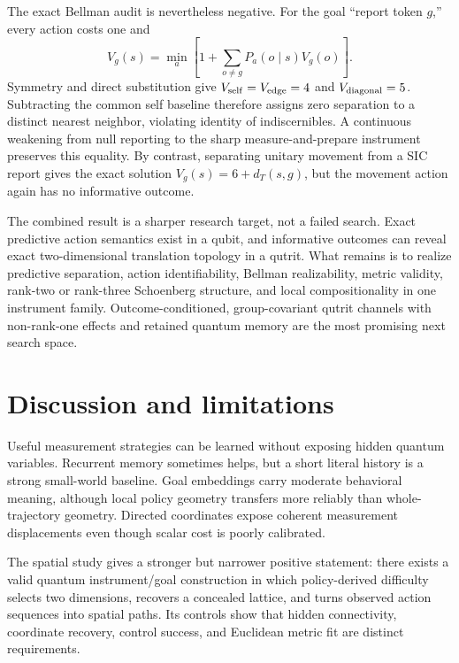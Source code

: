\documentclass[11pt]{article}
\begin{document}
The exact Bellman audit is nevertheless negative. For the goal ``report token
$g$,'' every action costs one and
\begin{equation}
 V_g(s)=\min_a\left[1+\sum_{o\ne g}P_a(o\mid s)V_g(o)\right].
\end{equation}
Symmetry and direct substitution give $V_{\rm self}=V_{\rm edge}=4$ and
$V_{\rm diagonal}=5$. Subtracting the common self baseline therefore assigns
zero separation to a distinct nearest neighbor, violating identity of
indiscernibles. A continuous weakening from null reporting to the sharp
measure-and-prepare instrument preserves this equality. By contrast, separating
unitary movement from a SIC report gives the exact solution
$V_g(s)=6+d_T(s,g)$, but the movement action again has no informative outcome.

The combined result is a sharper research target, not a failed search. Exact
predictive action semantics exist in a qubit, and informative outcomes can
reveal exact two-dimensional translation topology in a qutrit. What remains is
to realize predictive separation, action identifiability, Bellman
realizability, metric validity, rank-two or rank-three Schoenberg structure,
and local compositionality in one instrument family. Outcome-conditioned,
group-covariant qutrit channels with non-rank-one effects and retained quantum
memory are the most promising next search space.

\section{Discussion and limitations}
\label{sec:discussion}

Useful measurement strategies can be learned without exposing hidden quantum
variables. Recurrent memory sometimes helps, but a short literal history is a
strong small-world baseline. Goal embeddings carry moderate behavioral
meaning, although local policy geometry transfers more reliably than
whole-trajectory geometry. Directed coordinates expose coherent measurement
displacements even though scalar cost is poorly calibrated.

The spatial study gives a stronger but narrower positive statement: there
exists a valid quantum instrument/goal construction in which policy-derived
difficulty selects two dimensions, recovers a concealed lattice, and turns
observed action sequences into spatial paths. Its controls show that hidden
connectivity, coordinate recovery, control success, and Euclidean metric fit
are distinct requirements.
\end{document}
